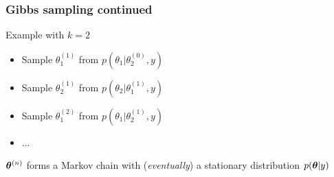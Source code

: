 \begin{frame}[t]

\frametitle{Gibbs sampling continued}

Example with $k=2$

\vspace{-1.8cm}
\vspace{-15.8cm}

\begin{itemize}
\item Sample  $\theta_1^{(1)}$ from   $p(\theta_1|\theta_2^{(0)}, y)$ \vspace{0.5mm}
\item Sample  $\theta_2^{(1)}$ from $p(\theta_2|\theta_1^{(1)}, y)$ \vspace{0.5mm}
\item Sample $\theta_1^{(2)}$ from $p(\theta_1|\theta_2^{(1)}, y)$ \vspace{0.5mm}
\item $\hdots$\vspace{1mm}
\end{itemize}
$\boldsymbol{\theta}^{(n)}$ forms a Markov chain with ({\em eventually}) a
 stationary distribution $p(\boldsymbol{\theta} | y)$

\end{frame}


